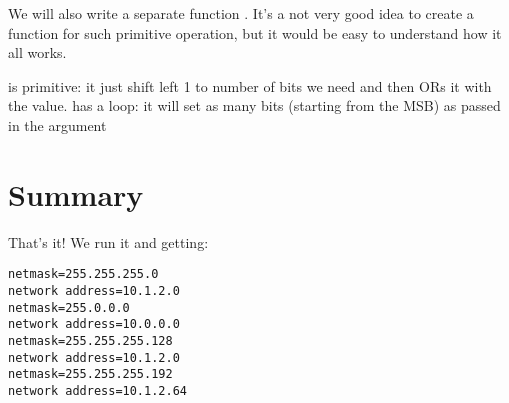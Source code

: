 We will also write a separate function . 
It's a not very good idea to create a function
for such primitive operation, but it would be easy to understand how it all works.



 is primitive: it just shift left 1 to number of bits we need and then 
ORs it with the  value.
 has a loop: it will set as many bits (starting from the \ac{MSB}) as 
passed in the  argument

\section{Summary}

That's it!
We run it and getting:

\begin{lstlisting}
netmask=255.255.255.0
network address=10.1.2.0
netmask=255.0.0.0
network address=10.0.0.0
netmask=255.255.255.128
network address=10.1.2.0
netmask=255.255.255.192
network address=10.1.2.64
\end{lstlisting}
